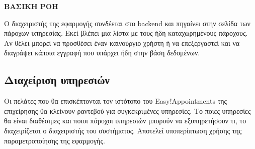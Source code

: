 \textbf{ΒΑΣΙΚΗ ΡΟΗ}

Ο διαχειριστής της εφαρμογής συνδέεται στο backend και πηγαίνει στην σελίδα των πάροχων υπηρεσίας. Εκεί βλέπει μια λίστα με τους ήδη καταχωρημένους πάροχους. Αν θέλει μπορεί να προσθέσει έναν καινούργιο χρήστη ή να επεξεργαστεί και να διαγράψει κάποια εγγραφή που υπάρχει ήδη στην βάση δεδομένων.

\subsection {Διαχείριση υπηρεσιών}
Οι πελάτες που θα επισκέπτονται τον ιστότοπο του Easy!Appointments της επιχείρησης θα κλείνουν ραντεβού για συγκεκριμένες υπηρεσίες. Το ποιες υπηρεσίες θα είναι διαθέσιμες και ποιοι πάροχοι υπηρεσιών μπορούν να εξυπηρετήσουν τι, το διαχειρίζεται ο διαχειριστής του συστήματος. Αποτελεί υποπερίπτωση χρήσης της παραμετροποίησης της εφαρμογής.